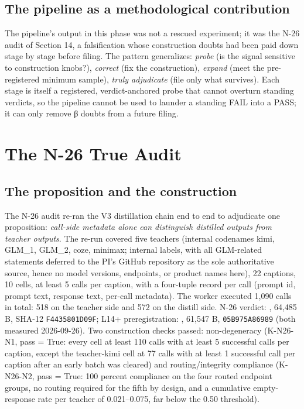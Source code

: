 \documentclass[11pt]{article}
\newcommand{\sha}[1]{\texttt{#1}}
\begin{document}
\subsection{The pipeline as a methodological contribution}
\noindent The pipeline's output in this phase was not a rescued experiment; it was the N-26 audit of Section 14, a falsification whose construction doubts had been paid down stage by stage before filing. The pattern generalizes: \emph{probe} (is the signal sensitive to construction knobs?), \emph{correct} (fix the construction), \emph{expand} (meet the pre-registered minimum sample), \emph{truly adjudicate} (file only what survives). Each stage is itself a registered, verdict-anchored probe that cannot overturn standing verdicts, so the pipeline cannot be used to launder a standing FAIL into a PASS; it can only remove β doubts from a future filing.\par
\section{The N-26 True Audit}
\label{sec:14}
\subsection{The proposition and the construction}
\noindent The N-26 audit re-ran the V3 distillation chain end to end to adjudicate one proposition: \emph{call-side metadata alone can distinguish distilled outputs from teacher outputs}. The re-run covered five teachers (internal codenames kimi, GLM\_1, GLM\_2, coze, minimax; internal labels, with all GLM-related statements deferred to the PI's GitHub repository as the sole authoritative source, hence no model versions, endpoints, or product names here), 22 captions, 10 cells, at least 5 calls per caption, with a four-tuple record per call (prompt id, prompt text, response text, per-call metadata). The worker executed 1,090 calls in total: 518 on the teacher side and 572 on the distill side. N-26 verdict: , 64,485 B, SHA-12 \sha{F4435801D09F}; L14+ preregistration: , 61,547 B, \sha{05B975A86989} (both measured 2026-09-26). Two construction checks passed: non-degeneracy (K-N26-N1, pass = True: every cell at least 110 calls with at least 5 successful calls per caption, except the teacher-kimi cell at 77 calls with at least 1 successful call per caption after an early batch was cleared) and routing/integrity compliance (K-N26-N2, pass = True: 100 percent compliance on the four routed endpoint groups, no routing required for the fifth by design, and a cumulative empty-response rate per teacher of 0.021–0.075, far below the 0.50 threshold).\par
\end{document}
